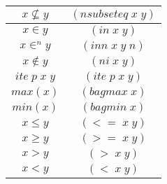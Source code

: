 \begin{appendices}
\begin{center}
\begin{tabular}{|c|c|}
  \hline
  $x \nsubseteq y$ & $(nsubseteq \;x \;y)$ \\
  \hline
  $x \in y$ & $(in \;x \;y)$ \\
  \hline
  $x \in^{n} y$ & $(inn \;x \;y \;n)$ \\
  \hline
  $x \notin y$ & $(ni \;x \;y)$ \\
  \hline
  $ite \;p \;x \;y$ & $(ite\;p\;x\;y)$ \\
  \hline
  $max(x)$ & $(bagmax \;x )$ \\
  \hline
  $min(x)$ & $(bagmin \;x )$ \\
  \hline
  $x \leq y$ & $(<= \;x \;y)$ \\
  \hline
  $x \geq y$ & $(>= \;x \;y)$ \\
  \hline
  $x > y$ & $(> \;x \;y)$ \\
  \hline
  $x < y$ & $(< \;x \;y)$ \\
  \hline


\end{tabular}
\end{center}
\end{appendices}
